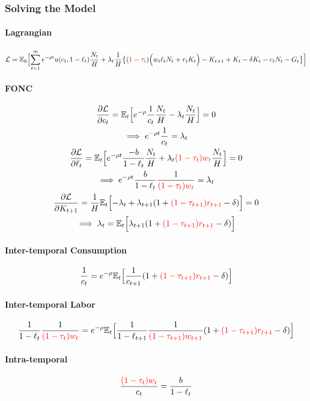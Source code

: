 \documentclass[11pt]{article}
\newcommand{\expat}[2]{\mathbb{E}_{#1}\Big[{#2}\Big]}
\begin{document}
			\subsubsection{Solving the Model}	
			\paragraph{Lagrangian}
				\begin{equation}
					\mc{L} = \expat{0}{ \sum_{t=1}^\infty e^{-\rho t} u(c_t, 1 - \ell_t) \frac{N_t}{H} + \lambda_t \frac{1}{H}
						\big \{ (\textcolor{red}{1-\tau_t}) \Big (w_t \ell_t N_t + r_t K_t \Big) - K_{t+1} + K_t - \delta K_t - c_t N_t - G_t \big \}}
				\end{equation}
			
			\paragraph{FONC}
				\begin{gather}
					\pd{\mc{L}}{c_t} = \expat{t}{e^{-\rho} \frac{1}{c_t} \frac{N_t}{H} - \lambda_t \frac{N_t}{H}} = 0 \\
					\implies e^{-\rho t} \frac{1}{c_t} = \lambda_t \\
					\pd{\mc{L}}{\ell_t} = \expat{t}{e^{-\rho t} \frac{-b}{1 - \ell_t} \frac{N_t}{H} + \lambda_t \textcolor{red}{(1-\tau_t) w_t} \frac{N_t}{H}} = 0 \\
					\implies e^{-\rho t} \frac{b}{1-\ell_t} \frac{1}{\textcolor{red}{(1-\tau_t) w_t}}= \lambda_t \\
					\pd{\mc{L}}{K_{t+1}} = \frac{1}{H} \expat{t}{
						- \lambda_t + \lambda_{t+1}(1 + \textcolor{red}{(1 - \tau_{t+1})r_{t+1}} - \delta) 
					} = 0 \\
					\implies \lambda_t = \expat{t}{\lambda_{t+1}(1 + \textcolor{red}{(1 - \tau_{t+1})r_{t+1}} - \delta)}
				\end{gather}
			
			\paragraph{Inter-temporal Consumption}
				\begin{equation}
					\frac{1}{c_t} = e^{-\rho} \expat{t}{\frac{1}{c_{t+1}} (1 + \textcolor{red}{(1 - \tau_{t+1})r_{t+1}} - \delta)
					}
				\end{equation}
			
			\paragraph{Inter-temporal Labor}
				\begin{equation}
					\frac{1}{1-\ell_t} \frac{1}{\textcolor{red}{(1-\tau_t)w_t}} = e^{-\rho} \expat{t}{
						\frac{1}{1-\ell_{t+1}} \frac{1}{\textcolor{red}{(1-\tau_{t+1})w_{t+1}}}(1 + \textcolor{red}{(1 - \tau_{t+1})r_{t+1}} - \delta)
					}
				\end{equation}
				
			\paragraph{Intra-temporal}
				\begin{equation}
					\frac{\textcolor{red}{(1-\tau_t) w_t}}{c_t} = \frac{b}{1-\ell_t}
				\end{equation}
\end{document}

